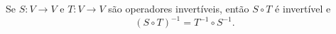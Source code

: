 \begin{proposicao}
  Se $S \colon V \to V$ e $T \colon V \to V$  são operadores invertíveis,  então $S \circ T$ é invertível e
  \[
    (S \circ T)^{-1}  = T^{-1}  \circ S^{-1}.
  \]
\end{proposicao}

%
%
%
%
